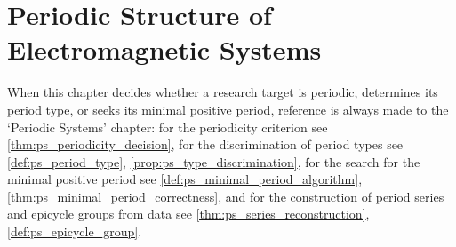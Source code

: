 \chapter{Periodic Structure of Electromagnetic Systems}

\begin{remark}\label{rem:em_ps_hook}
When this chapter decides whether a research target is periodic, determines its period type, or seeks its minimal positive period, reference is always made to the `Periodic Systems' chapter:
for the periodicity criterion see \cref{thm:ps_periodicity_decision},
for the discrimination of period types see \cref{def:ps_period_type}, \cref{prop:ps_type_discrimination},
for the search for the minimal positive period see \cref{def:ps_minimal_period_algorithm}, \cref{thm:ps_minimal_period_correctness},
and for the construction of period series and epicycle groups from data see \cref{thm:ps_series_reconstruction}, \cref{def:ps_epicycle_group}.
\end{remark}

